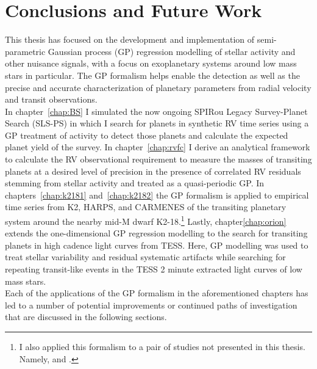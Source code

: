 \chapter[Conclusions and Future Work]{Conclusions and Future Work}

This thesis has focused on the development and implementation of
semi-parametric Gaussian process (GP) regression modelling of stellar activity
and other nuisance signals, with a focus on exoplanetary systems around low mass
stars in particular. The GP formalism helps enable the detection as
well as the precise and accurate characterization of planetary parameters
from radial velocity and transit observations. \\

In chapter~\ref{chap:BS} I simulated the
now ongoing SPIRou Legacy Survey-Planet Search (SLS-PS)
in which I search for planets
in synthetic RV time series using a GP treatment of activity to detect
those planets and calculate the expected planet yield of the survey. In
chapter~\ref{chap:rvfc} I derive an analytical framework to calculate the
RV observational requirement to measure the masses of transiting planets at
a desired level of precision in the presence of correlated RV residuals stemming
from stellar activity and treated as a quasi-periodic GP.
In chapters~\ref{chap:k2181} and~\ref{chap:k2182} the GP formalism is
applied to empirical time series from K2, HARPS, and CARMENES of the transiting
planetary system around the nearby mid-M dwarf K2-18.\footnote{I also applied this
formalism to a pair of studies not presented in this thesis. Namely, \cite{bonfils18}
and \cite{ment19}.} Lastly,
chapter\ref{chap:orion} extends the one-dimensional GP regression modelling to
the search for transiting planets in high cadence light curves from TESS. Here,
GP modelling was used to treat stellar variability and residual systematic
artifacts while searching for repeating transit-like events in the TESS 2 minute
extracted light curves of low mass stars. \\

Each of the applications of the GP formalism in the aforementioned chapters
has led to a number of potential improvements or continued paths of investigation
that are discussed in the following sections.


